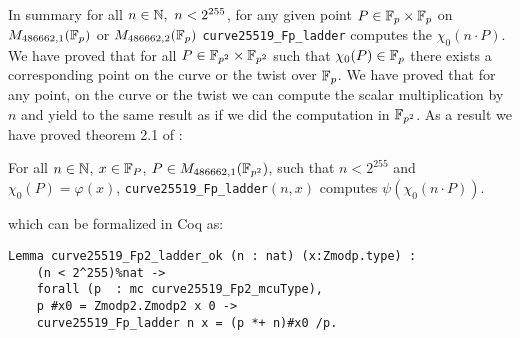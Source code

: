 In summary for all $n \in \mathbb{N},\ n < 2^{255}$, for any given point $P\in\mathbb{F}_{p}\times\mathbb{F}_{p}$ on $M_{486662,1}(\mathbb{F}_{p})$ or $M_{486662,2}(\mathbb{F}_{p})$ \texttt{curve25519\_Fp\_ladder} computes the $\chi_0(n \cdot P)$.
We have proved that for all $P \in \mathbb{F}_{p^2}\times\mathbb{F}_{p^2}$ such that $\chi_0(P) \in \mathbb{F}_{p}$ there exists a corresponding point on the curve or the twist over $\mathbb{F}_{p}$.
We have proved that for any point, on the curve or the twist we can compute the scalar multiplication by $n$ and yield to the same result as if we did the computation in $\mathbb{F}_{p^2}$. As a result we have proved theorem 2.1 of \cite{Ber06}:
\begin{theorem}
For all $n \in \mathbb{N}$, $x \in \mathbb{F}_{P}$, $P \in M_{486662,1}(\mathbb{F}_{p^2})$, such that $n < 2^{255}$ and $\chi_0(P) = \varphi(x)$, \texttt{curve25519\_Fp\_ladder}$(n, x)$ computes $\psi(\chi_0(n \cdot P))$.
\end{theorem}
which can be formalized in Coq as:
\begin{lstlisting}[language=Coq]
Lemma curve25519_Fp2_ladder_ok (n : nat) (x:Zmodp.type) :
    (n < 2^255)%nat ->
    forall (p  : mc curve25519_Fp2_mcuType),
    p #x0 = Zmodp2.Zmodp2 x 0 ->
    curve25519_Fp_ladder n x = (p *+ n)#x0 /p.
\end{lstlisting}
